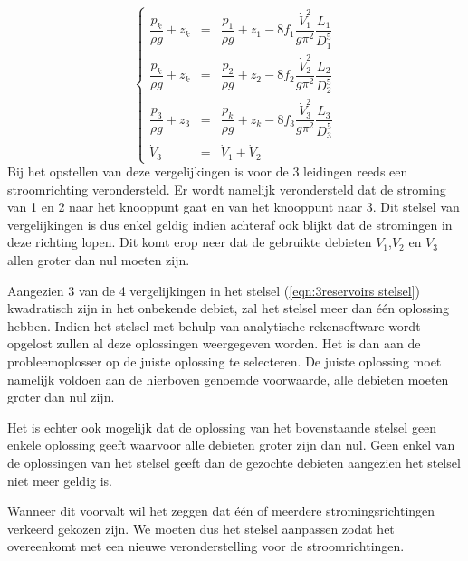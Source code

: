 \begin{equation}
	\left\{
	\begin{array}{lcl}
		\dfrac{p_k}{\rho g} + z_k &=& \dfrac{p_1}{\rho g} + z_1 - 8 f_1 \dfrac{\dot{V}_1^2}{g \pi^2} \dfrac{L_1}{D_1^5} \\
		\dfrac{p_k}{\rho g} + z_k &=& \dfrac{p_2}{\rho g} + z_2 - 8 f_2 \dfrac{\dot{V}_2^2}{g \pi^2} \dfrac{L_2}{D_2^5} \\
		\dfrac{p_3}{\rho g} + z_3 &=& \dfrac{p_k}{\rho g} + z_k - 8 f_3 \dfrac{\dot{V}_3^2}{g \pi^2} \dfrac{L_3}{D_3^5} \\
		\dot{V}_3 &=& \dot{V}_1 + \dot{V}_2
	\end{array}
	\right.
	\label{eqn:3reservoirs stelsel}
\end{equation}
Bij het opstellen van deze vergelijkingen is voor de 3 leidingen reeds een stroomrichting verondersteld. Er wordt namelijk verondersteld dat de stroming van 1 en 2 naar het knooppunt gaat en van het knooppunt naar 3. Dit stelsel van vergelijkingen is dus enkel geldig indien achteraf ook blijkt dat de stromingen in deze richting lopen. Dit komt erop neer dat de gebruikte debieten $V_1$,$V_2$ en $V_3$ allen groter dan nul moeten zijn.

Aangezien 3 van de 4 vergelijkingen in het stelsel (\ref{eqn:3reservoirs stelsel}) kwadratisch zijn in het onbekende debiet, zal het stelsel meer dan één oplossing hebben. Indien het stelsel met behulp van analytische rekensoftware wordt opgelost zullen al deze oplossingen weergegeven worden. Het is dan aan de probleemoplosser op de juiste oplossing te selecteren. De juiste oplossing moet namelijk voldoen aan de hierboven genoemde voorwaarde, alle debieten moeten groter dan nul zijn.

Het is echter ook mogelijk dat de oplossing van het bovenstaande stelsel geen enkele oplossing geeft waarvoor alle debieten groter zijn dan nul. Geen enkel van de oplossingen van het stelsel geeft dan de gezochte debieten aangezien het stelsel niet meer geldig is.

Wanneer dit voorvalt wil het zeggen dat één of meerdere stromingsrichtingen verkeerd gekozen zijn. We moeten dus het stelsel aanpassen zodat het overeenkomt met een nieuwe veronderstelling voor de stroomrichtingen.

